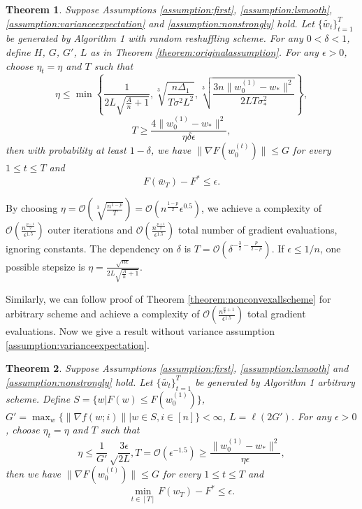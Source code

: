 \documentclass{article} %
\theoremstyle{plain}
\newtheorem{theorem}{Theorem}[section]
\theoremstyle{definition}
\theoremstyle{remark}
\begin{document}
\begin{theorem}
\label{theorem:nonstrongly}
Suppose Assumptions \ref{assumption:first}, \ref{assumption:lsmooth}, \ref{assumption:varianceexpectation} and \ref{assumption:nonstrongly} hold. Let $\{\tilde{w_t}\}_{t=1}^T$ be generated by Algorithm 1 with random reshuffling scheme. For any $0<\delta<1$, define $H$, $G$, $G'$, $L$ as in Theorem \ref{theorem:originalassumption}. For any $\epsilon>0$, choose $\eta_t=\eta$ and $T$ such that
    $$\eta\leq \min \left\{\frac{1}{2L\sqrt{\frac{A}{n}+1}}, \sqrt[3]{\frac{n\Delta_1}{T\sigma^2 L^2}}, \sqrt[3]{\frac{3n\|w^{(1)}_0-w_*\|^2}{2LT\sigma_*^2}}\right\},$$
    $$T\geq \frac{4\|w^{(1)}_0-w_*\|^2}{\eta \delta\epsilon},$$
    then with probability at least $1-\delta$, we have $\|\nabla F(w^{(t)}_0)\|\leq G$ for every $1\leq t\leq T$ and $$F(\bar{w}_T)-F^*\leq \epsilon.$$
\end{theorem}

By choosing $\eta = \mathcal{O}\left(\sqrt[3]{\frac{n^{1-p}}{T}}\right)=\mathcal{O}\left(n^\frac{1-p}{2}\epsilon^{0.5}\right)$, we achieve a complexity of $\mathcal{O}\left(\frac{n^{\frac{p-1}{2}}}{\epsilon^{1.5}}\right)$ outer iterations and $\mathcal{O}\left(\frac{n^{\frac{p+1}{2}}}{\epsilon^{1.5}}\right)$ total number of gradient evaluations, ignoring constants. The dependency on $\delta$ is $T=\mathcal{O}(\delta^{-\frac{3}{2}-\frac{p}{2-p}})$. If $\epsilon\leq 1/n$, one possible stepsize is $\eta=\frac{\sqrt{n\epsilon}}{2L\sqrt{\frac{A}{n}+1}}.$

Similarly, we can follow proof of Theorem \ref{theorem:nonconvexallscheme} for arbitrary scheme and achieve a complexity of $\mathcal{O}\left(\frac{n^{\frac{p}{2}+1}}{\epsilon^{1.5}}\right)$ total gradient evaluations. Now we give a result without variance assumption \ref{assumption:varianceexpectation}.

\begin{theorem}
\label{theorem:nonstronglyany}
    Suppose Assumptions \ref{assumption:first}, \ref{assumption:lsmooth} and \ref{assumption:nonstrongly} hold. Let $\{\tilde{w_t}\}_{t=1}^T$ be generated by Algorithm 1 arbitrary scheme. Define $S=\{w|F(w)\leq F(w^{(1)}_0)\}$, $G'=\max_w\{\|\nabla f(w;i)\||w\in S, i\in[n]\}<\infty$, $L=\ell(2G')$. For any $\epsilon>0$, choose $\eta_t=\eta$ and $T$ such that
    $$\eta\leq \frac{1}{G'}\sqrt\frac{3\epsilon}{2L}, T=\mathcal{O}(\epsilon^{-1.5})\geq \frac{\|w^{(1)}_0-w_*\|^2}{\eta \epsilon},$$
    then we have $\|\nabla F(w^{(t)}_0)\|\leq G$ for every $1\leq t\leq T$ and
    $$\min_{t\in[T]}F(w_T)-F^*\leq \epsilon.$$
\end{theorem}
\end{document}

